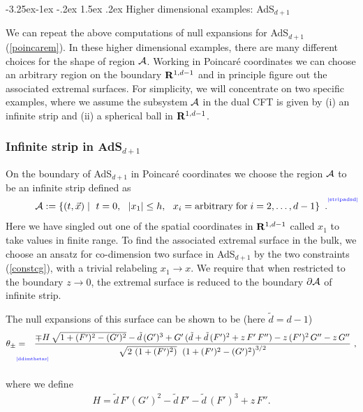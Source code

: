 \documentclass[12pt]{article}
\makeatletter
\renewcommand\subsection{\@startsection{subsection}{2}{\z@}%
                                     {-3.25ex\@plus -1ex \@minus -.2ex}%
                                     {1.5ex \@plus .2ex}%
                                     {\normalfont\bfseries}}
\def\req#1{(\ref{#1})}
\def\({\left (}
\def\){\right )}
\def\p{\partial}
\def\s{\sigma}
\def\CA{{\cal A}}
\def\R{{\bf R}}
\def\p{\partial}
\def\f#1#2{{\frac{#1}{#2}}}
\def\f#1#2{{\frac{#1}{#2}}}
\def\p{\partial}
\def\Label#1{\label{#1}%
{ \color{blue}{\smash{\hbox to0pt{\raise2ex\hbox{\tiny[#1]}\hss}}}}}
\def\rA{\CA}
\def\brA{\p \CA}
\def\ads#1{AdS$_{#1}$}
\def\s{\sqrt}
\def\f {\frac}
\def\ti{\tilde}
\def\no{\nonumber \\}
\makeatother
\begin{document}
\subsection{Higher dimensional examples: AdS$_{d+1}$}
\label{highdex}

We can repeat the above computations of null expansions
for AdS$_{d+1}$ \req{poincarem}. In these higher dimensional examples,
there are many different choices for the shape of region $\rA$.
Working in Poincar\'e coordinates we can choose an arbitrary region
on the boundary $\R^{1,d-1}$ and in principle figure out the
associated extremal surfaces. For simplicity, we will concentrate on
two  specific examples, where we assume the subsystem $\rA$ in the
dual CFT is given by (i) an infinite strip  and (ii) a spherical
ball in $\R^{1,d-1}$.

\subsubsection{Infinite strip in AdS$_{d+1}$}
\label{inst}

On the boundary of \ads{d+1} in Poincar\'e coordinates we choose the region $\rA$ to be an infinite strip defined as
%
\begin{equation}
 \rA := \left\{ (t, \vec{ x }) \mid \ t = 0 , \ \  |x_1| \le h,\ \   x_i =
 {\rm arbitrary\; for}\;  i = 2, \ldots, d-1 \right\} \ .
\Label{stripadsd}
\end{equation}
 Here we have singled out one of the spatial coordinates in $\R^{1,d-1}$ called $x_1$ to take values in  finite range. To find the associated extremal surface in the bulk, we choose an ansatz for co-dimension two surface in AdS$_{d+1}$ by
the two constraints \req{constcg}, with a trivial relabeling $x_1 \to x$.  We require that when restricted to the boundary $z\to 0$, the extremal surface  is reduced to the boundary $\brA$ of infinite strip.


The null expansions of this surface can be shown to be  (here $\ti{d}=d-1$)
%
\begin{eqnarray}
\theta_\pm &=& \f{\mp H\,\s{1+(F')^2-(G')^2} -\ti{d}\,(G')^3+G'\,
(\ti{d} +\ti{d}\, (F')^2+z\, F'\, F'')-z\,(F')^2\,G''-z\,G''}{\s{2
\, \(1+(F')^2\)}\, \; \(1+(F')^2-(G')^2\)^{3/2}} \ , \no
\Label{ddimthetas}
\end{eqnarray}
%
where we define
\begin{eqnarray}
H=\ti{d}\,F'(G')^2-\ti{d}\,F'-\ti{d}\, (F')^3+z \,F''.
\end{eqnarray}
%
\end{document}
